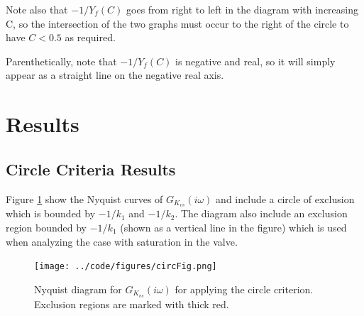 \documentclass[a4paper, titlepage]{article}
\begin{document}
Note also that $-1/Y_{f}(C)$ goes from right to left in the diagram with increasing C, so the intersection of the two graphs must occur to the right of the circle to have $C < 0.5$ as required.

Parenthetically, note that $-1/Y_{f}(C)$ is negative and real, so it will simply appear as a straight line on the negative real axis. 


\section{Results}

\subsection{Circle Criteria Results}
Figure \ref{fig:circCrit} show the Nyquist curves of $G_{K_{vs}}(i\omega)$ and include a circle of exclusion which is bounded by $-1/k_{1}$ and $-1/k_{2}$.  The diagram also include an exclusion region bounded by $-1/k_{1}$ (shown as a vertical line in the figure) which is used when analyzing the case with saturation in the valve.

\begin{figure}[H]
\center
\texttt{[image: ../code/figures/circFig.png]}
\caption{Nyquist diagram for $G_{K_{vs}}(i\omega)$ for applying the circle criterion. Exclusion regions are marked with thick red.}
\label{fig:circCrit}
\end{figure}

%
%
%
%
%
%
\end{document}
